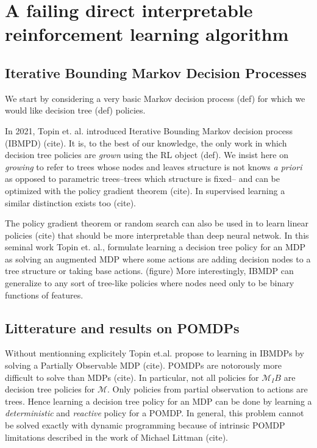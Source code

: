 \chapter{A failing direct interpretable reinforcement learning algorithm}

\section{Iterative Bounding Markov Decision Processes}
We start by considering a very basic Markov decision process (def) for which we would like decision tree (def) policies. 
 
In 2021, Topin et. al. introduced Iterative Bounding Markov decision process (IBMPD) (cite). It is, to the best of our knowledge, the only work in which decision tree policies are \textit{grown} using the RL object (def).
We insist here on \textit{growing} to refer to trees whose nodes and leaves structure is not knows \textit{a priori} as opposed to parametric trees--trees which structure is fixed-- and can be optimized with the policy gradient theorem (cite).
In supervised learning a similar distinction exists too (cite).

The policy gradient theorem or random search can also be used in to learn linear policies (cite) that should be more interpretable than deep neural netwok. 
In this seminal work Topin et. al., formulate learning a decision tree policy for an MDP as solving an augmented MDP where some actions are adding decision nodes to a tree structure or taking base actions. (figure)
More interestingly, IBMDP can generalize to any sort of tree-like policies where nodes need only to be binary functions of features.  

\section{Litterature and results on POMDPs}
Without mentionning explicitely Topin et.al. propose to learning in IBMDPs by solving a Partially Observable MDP (cite). POMDPs are notorously more difficult to solve than MDPs (cite).
In particular, not all policies for $\mathcal{M}_IB$ are decision tree policies for $\mathcal{M}$. Only policies from partial observation to actions are trees. 
Hence learning a decision tree policy for an MDP can be done by learning a \textit{deterministic} and \textit{reactive} policy for a POMDP. 
In general, this problem cannot be solved exactly with dynamic programming because of intrinsic POMDP limitations described in the work of Michael Littman (cite).

